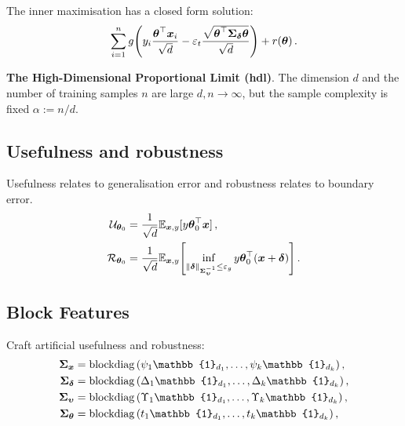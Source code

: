 \documentclass[a0paper,fleqn]{betterportraitposter}
\theoremstyle{plain}
\theoremstyle{definition}
\theoremstyle{remark}
\begin{document}
{\begin{multicols}{3}
The inner maximisation has a closed form solution:
\begin{equation}\label{eq:modified-minimisation-problem}
    \sum_{i = 1}^{n} 
    g \qty(
        y_{i} \frac{\boldsymbol{\theta}^\top \boldsymbol{x}_{i}}{\sqrt{d}} 
        - \varepsilon_t \frac{\sqrt{\boldsymbol{\theta}^\top \boldsymbol{\Sigma}_{\boldsymbol{\delta}} \boldsymbol{\theta}}}{\sqrt{d}} 
    ) 
    + r(\boldsymbol{\theta}) \,.
\end{equation}

\textbf{The High-Dimensional Proportional Limit (hdl)}. The dimension \(d\) and the number of training samples \(n\) are large \(d,n \to \infty\), but the sample complexity is fixed \(\alpha := n / d\).


\subsection{Usefulness and robustness}
Usefulness relates to generalisation error and robustness relates to boundary error.
\begin{align}
   \mathcal{U}_{\boldsymbol{\theta}_0}
   &= \frac{1}{\sqrt{d}} \mathbb{E}_{\boldsymbol{x}, y}[y \boldsymbol{\theta}_0^\top \boldsymbol{x} ] \,, \label{eq:mt-usefulness-def} \\
   \mathcal{R}_{\boldsymbol{\theta}_0} &= \frac{1}{\sqrt{d}} \mathbb{E}_{\boldsymbol{x}, y}\qty[
       \inf_{\norm{\boldsymbol{\delta}}_{\boldsymbol{\Sigma}_{\boldsymbol{\upsilon}}^{-1}}  \leq \varepsilon_g} y \boldsymbol{\theta}_0^\top ( \boldsymbol{x} + \boldsymbol{\delta})
   ]\,. \label{eq:mt-robustness-def}
\end{align}

\subsection{Block Features}
Craft artificial usefulness and robustness:
\begin{equation}
\begin{aligned}
   \Sigmax &= \operatorname{blockdiag}\qty( \psi_1 \mathbb{1}_{d_1}, \dots, \psi_k \mathbb{1}_{d_k} ) \,, \\
   \Sigmadelta &= \operatorname{blockdiag}\qty( \Delta_1 \mathbb{1}_{d_1}, \dots, \Delta_k \mathbb{1}_{d_k} ) \,, \\
   \Sigmaupsilon &= \operatorname{blockdiag}\qty( \Upsilon_1 \mathbb{1}_{d_1},  \dots, \Upsilon_k \mathbb{1}_{d_k} ) \,, \\
   \Sigmatheta &= \operatorname{blockdiag}\qty( t_1 \mathbb{1}_{d_1}, \dots, t_k \mathbb{1}_{d_k} ) \,,
\end{aligned}
\end{equation}



\end{multicols}}
\end{document}
